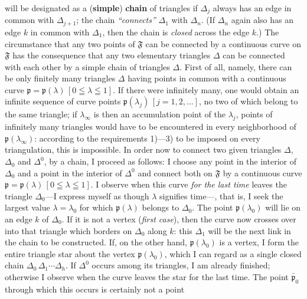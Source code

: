 \documentclass{article}
\begin{document}
will be designated as a (\textbf{simple}) \textbf{chain} of triangles if $\Delta_j$ always has an edge in common with $\Delta_{j+1}$; the chain \emph{``connects''} $\Delta_1$ with $\Delta_n$. (If $\Delta_n$ again also has an edge $k$ in common with $\Delta_1$, then the chain is \emph{closed} across the edge $k$.) The circumstance that any two points of $\mathfrak{F}$ can be connected by a continuous curve on $\mathfrak{F}$ has the consequence that any two elementary triangles $\Delta$ can be connected with each other by a simple chain of triangles $\Delta$. First of all, namely, there can be only finitely many triangles $\Delta$ having points in common with a continuous curve $\mathfrak{p} = \mathfrak{p}(\lambda)\,[0 \leqq \lambda \leqq 1]$. If there were infinitely many, one would obtain an infinite sequence of curve points $\mathfrak{p}(\lambda_j)\,[j = 1, 2, \dots]$, no two of which belong to the same triangle; if $\lambda_\infty$ is then an accumulation point of the $\lambda_j$, points of infinitely many triangles would have to be encountered in every neighborhood of $\mathfrak{p}(\lambda_\infty)$: according to the requirements 1)---3) to be imposed on every triangulation, this is impossible. In order now to connect two given triangles $\Delta$, $\Delta_0$ and $\Delta^0$, by a chain, I proceed as follows: I choose any point in the interior of $\Delta_0$ and a point in the interior of $\Delta^0$ and connect both on $\mathfrak{F}$ by a continuous curve $\mathfrak{p} = \mathfrak{p}(\lambda)\,[0 \leqq \lambda \leqq 1]$. I observe when this curve \emph{for the last time} leaves the triangle $\Delta_0$---I express myself as though $\lambda$ signifies time---, that is, I seek the largest value $\lambda = \lambda_0$ for which $\mathfrak{p}(\lambda)$ belongs to $\Delta_0$. The point $\mathfrak{p}(\lambda_0)$ will lie on an edge $k$ of $\Delta_0$. If it is not a vertex (\emph{first case}), then the curve now crosses over into that triangle which borders on $\Delta_0$ along $k$: this $\Delta_1$ will be the next link in the chain to be constructed. If, on the other hand, $\mathfrak{p}(\lambda_0)$ is a vertex, I form the entire triangle star about the vertex $\mathfrak{p}(\lambda_0)$, which I can regard as a single closed chain $\Delta_0\,\Delta_1 \cdots \Delta_h$. If $\Delta^0$ occurs among its triangles, I am already finished; otherwise I observe when the curve leaves the star for the last time. The point $\bar{\mathfrak{p}}_0$ through which this occurs is certainly not a point
\end{document}
